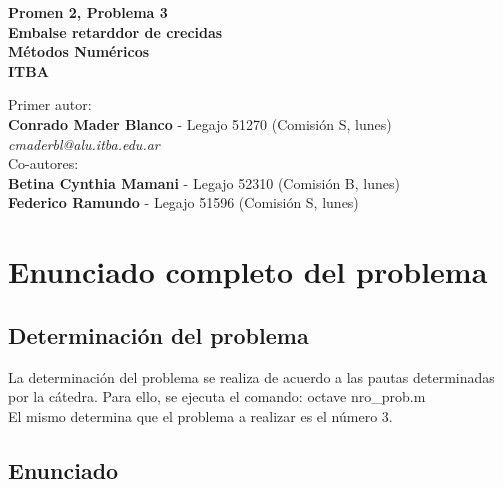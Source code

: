 \documentclass{article}
\begin{document}
\begin{center}
\textbf{
{\LARGE Promen 2, Problema 3\\
Embalse retarddor de crecidas\\
M\'etodos Num\'ericos\\
ITBA\\
}}

\end{center}
\vspace{8cm}

Primer autor:\\
\textbf{Conrado Mader Blanco} - Legajo 51270 (Comisi\'on S, lunes)\\
\textit{cmaderbl@alu.itba.edu.ar}\\

Co-autores:\\
\textbf{Betina Cynthia Mamani} - Legajo 52310 (Comisi\'on B, lunes)\\
\textbf{Federico Ramundo} - Legajo 51596 (Comisi\'on S, lunes)\\
\newpage

\section{Enunciado completo del problema}
\subsection{Determinaci\'on del problema}

La determinaci\'on del problema se realiza de acuerdo a las pautas determinadas por la c\'atedra. Para ello, se ejecuta el comando: octave nro\_prob.m\\

El mismo determina que el problema a realizar es el n\'umero 3.\\
\subsection {Enunciado}
\end{document}
